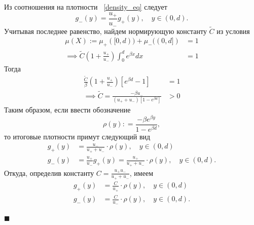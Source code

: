 \documentclass[12pt,a4paper]{article}
\begin{document}
Из соотношения на плотности ~\eqref{density_eq} следует
$$g_- (y) = \frac{u_+}{u_-} g_+ (y), \quad y \in (0, d).$$
Учитывая последнее равенство, найдем нормирующую константу $\widetilde{C}$ из условия
\begin{equation*}
    \begin{aligned}
   \mu (X) := \mu_+ ([0, d)) + \mu_- ((0, d]) &= 1\\
\implies \widetilde{C} \left( 1 + \frac{u_+}{u_-} \right) \int_0^d e^{\beta x} dx &= 1     
    \end{aligned}
\end{equation*}
 Тогда
\begin{equation*}
    \begin{aligned}
   \frac{\widetilde{C}}{\beta} \left( 1 + \displaystyle\frac{u_+}{u_-}\right) \left[ e^{\beta d} - 1\right] &= 1\\
\implies \widetilde{C} = \frac{- \beta u_-}{(u_+ + u_-) [1 - e^{\beta d}]} &> 0     
    \end{aligned}
\end{equation*}
Таким образом, если ввести обозначение 
$$\rho (y) : = \frac{- \beta e^{\beta y}}{1 - e^{\beta d}},$$
то итоговые плотности примут следующий вид
\begin{equation*}
    \begin{aligned}
  g_+ (y) &= \frac{u_-}{u_+ + u_-} \cdot \rho (y), \quad y \in (0, d)\\
g_- (y) &= \frac{u_+}{u_-} g_+ (y) = \frac{u_+}{u_+ + u_-} \cdot \rho (y), \quad y \in (0, d). 
    \end{aligned}
\end{equation*}
Откуда, определив константу $C = \displaystyle \frac{u_+ u_-}{u_+ + u_-}$, имеем
\begin{equation*}
    \begin{aligned}
        g_+ (y) &= \frac{C}{u_+} \cdot \rho (y), \quad y \in (0, d)\\
g_-(y) &= \frac{C}{u_-} \cdot \rho (y), \quad y \in (0, d).
    \end{aligned}
\end{equation*}

\begin{flushright}
$\blacksquare$
\end{flushright}
\end{document}
